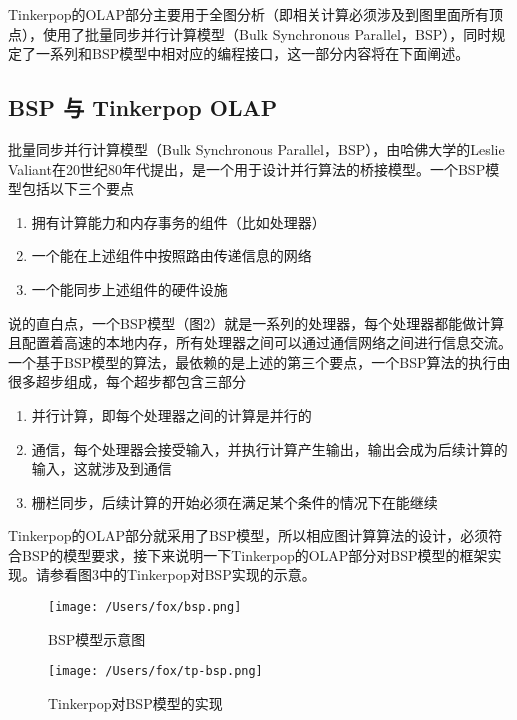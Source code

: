 \documentclass{article}
\begin{document}
Tinkerpop的OLAP部分主要用于全图分析（即相关计算必须涉及到图里面所有顶点），使用了批量同步并行计算模型（Bulk Synchronous Parallel，BSP），同时规定了一系列和BSP模型中相对应的编程接口，这一部分内容将在下面阐述。

\subsection{BSP 与 Tinkerpop OLAP}
批量同步并行计算模型（Bulk Synchronous Parallel，BSP），由哈佛大学的Leslie Valiant在20世纪80年代提出，是一个用于设计并行算法的桥接模型。一个BSP模型包括以下三个要点

\begin{enumerate}
\item 拥有计算能力和内存事务的组件（比如处理器）
\item 一个能在上述组件中按照路由传递信息的网络
\item 一个能同步上述组件的硬件设施
\end{enumerate}

说的直白点，一个BSP模型（图2）就是一系列的处理器，每个处理器都能做计算且配置着高速的本地内存，所有处理器之间可以通过通信网络之间进行信息交流。一个基于BSP模型的算法，最依赖的是上述的第三个要点，一个BSP算法的执行由很多超步组成，每个超步都包含三部分

\begin{enumerate}
\item 并行计算，即每个处理器之间的计算是并行的
\item 通信，每个处理器会接受输入，并执行计算产生输出，输出会成为后续计算的输入，这就涉及到通信
\item 栅栏同步，后续计算的开始必须在满足某个条件的情况下在能继续
\end{enumerate}

Tinkerpop的OLAP部分就采用了BSP模型，所以相应图计算算法的设计，必须符合BSP的模型要求，接下来说明一下Tinkerpop的OLAP部分对BSP模型的框架实现。请参看图3中的Tinkerpop对BSP实现的示意。

\begin{figure*}
    \centering
        \texttt{[image: /Users/fox/bsp.png]}
        \caption{BSP模型示意图}
\end{figure*}

\begin{figure*}
    \centering
        \texttt{[image: /Users/fox/tp-bsp.png]}
        \caption{Tinkerpop对BSP模型的实现}

\end{figure*}
\end{document}
